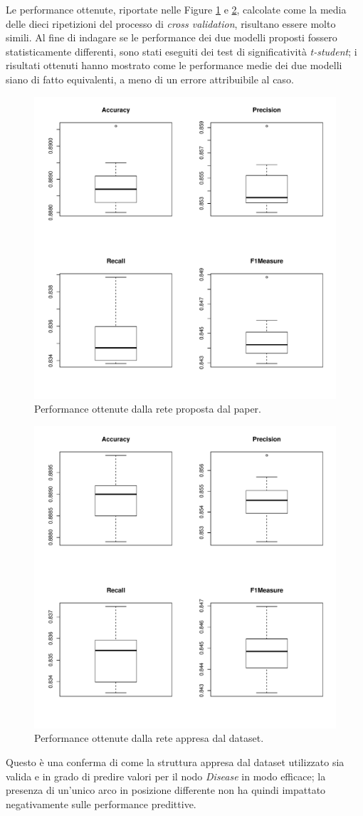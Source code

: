 Le performance ottenute, riportate nelle Figure \ref{fig:paperperformance} e \ref{fig:inducedperformance}, calcolate come la media delle dieci ripetizioni del processo di \textit{cross validation}, risultano essere molto simili. Al fine di indagare se le performance dei due modelli proposti fossero statisticamente differenti, sono stati eseguiti dei test di significatività \textit{t-student}; i risultati ottenuti hanno mostrato come le performance medie dei due modelli siano di fatto equivalenti, a meno di un errore attribuibile al caso.
\begin{figure}
	\centering
	\includegraphics[width=0.7\linewidth]{images/paper_performance}
	\caption{Performance ottenute dalla rete proposta dal paper.}
	\label{fig:paperperformance}
\end{figure}
\begin{figure}
	\centering
	\includegraphics[width=0.7\linewidth]{images/induced_performance}
	\caption{Performance ottenute dalla rete appresa dal dataset.}
	\label{fig:inducedperformance}
\end{figure}
Questo è una conferma di come la struttura appresa dal dataset utilizzato sia valida e in grado di predire valori per il nodo \textit{Disease} in modo efficace; la presenza di un'unico arco in posizione differente non ha quindi impattato negativamente sulle performance predittive.

